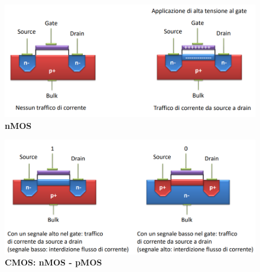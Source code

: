 \documentclass[12pt]{article}
\begin{document}
\newpage
    \begin{figure}[h]
        \centering
        \includegraphics[width=1\linewidth]{NMOS.png}
        \caption{\textbf{nMOS}}
        \label{fig:enter-label}
    \end{figure}
    
    \begin{figure}[h]
        \centering
        \includegraphics[width=1\linewidth]{cMos.png}
        \caption{\textbf{CMOS: nMOS - pMOS}}
        \label{fig:enter-label}
    \end{figure}

\newpage
\end{document}
